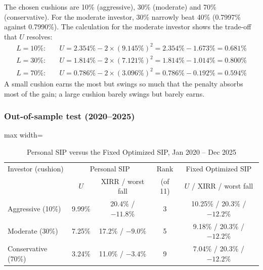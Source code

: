 The chosen cushions are 10\% (aggressive), 30\% (moderate) and 70\% (conservative). For the
moderate investor, 30\% narrowly beat 40\% (0.7997\% against 0.7990\%). The calculation for the
moderate investor shows the trade-off that $U$ resolves:
\begin{align*}
  L = 10\%:&\quad U = 2.354\% - 2 \times (9.145\%)^2 = 2.354\% - 1.673\% = 0.681\% \\
  L = 30\%:&\quad U = 1.814\% - 2 \times (7.121\%)^2 = 1.814\% - 1.014\% = 0.800\% \\
  L = 70\%:&\quad U = 0.786\% - 2 \times (3.096\%)^2 = 0.786\% - 0.192\% = 0.594\%
\end{align*}
A small cushion earns the most but swings so much that the penalty absorbs most of the gain; a large
cushion barely swings but barely earns.

\subsubsection{Out-of-sample test (2020--2025)}

\begin{table}[H]
\centering
\caption{Personal SIP versus the Fixed Optimized SIP, Jan 2020 -- Dec 2025}
\label{tab:personal}
\small
\begin{adjustbox}{max width=\textwidth}
\begin{tabular}{@{}lcccc@{}}
\toprule
Investor (cushion) & \multicolumn{2}{c}{Personal SIP} & Rank & Fixed Optimized SIP \\
 & $U$ & XIRR / worst fall & (of 11) & $U$ / XIRR / worst fall \\
\midrule
Aggressive (10\%) & 9.99\% & 20.4\% / $-11.8\%$ & 3 & 10.25\% / 20.3\% / $-12.2\%$ \\
Moderate (30\%) & 7.25\% & 17.2\% / $-9.0\%$ & 5 & 9.18\% / 20.3\% / $-12.2\%$ \\
Conservative (70\%) & 3.24\% & 11.0\% / $-3.4\%$ & 9 & 7.04\% / 20.3\% / $-12.2\%$ \\
\bottomrule
\end{tabular}
\end{adjustbox}
\end{table}

